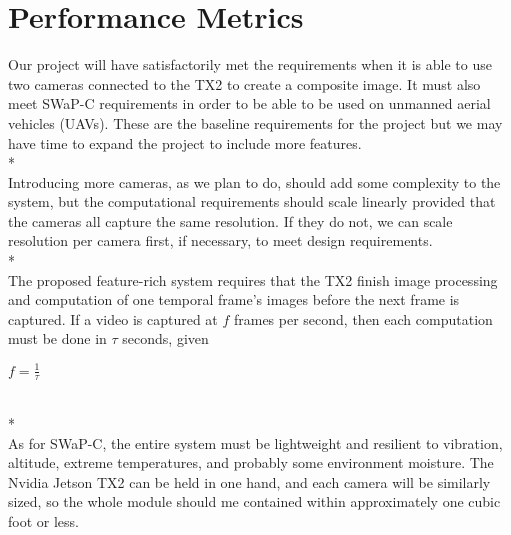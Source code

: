 \documentclass[10pt,letterpaper,draftclsnofoot,onecolumn]{report}
\begin{document}
\section*{Performance Metrics}
Our project will have satisfactorily met the requirements when it is able to use two cameras connected to the TX2 to create a composite image. It must also meet SWaP-C requirements in order to be able to be used on unmanned aerial vehicles (UAVs). These are the baseline requirements for the project but we may have time to expand the project to include more features.
\\*\\
Introducing more cameras, as we plan to do, should add some complexity to the system, but the computational requirements should scale linearly provided that the cameras all capture the same resolution. If they do not, we can scale resolution per camera first, if necessary, to meet design requirements.
\\*\\
The proposed feature-rich system requires that the TX2 finish image processing and computation of one temporal frame's images before the next frame is captured. 
If a video is captured at $f$ frames per second, then each computation must be done in $\tau$ seconds, given \begin{center}
$f = \frac{1}{\tau}$
\end{center}
\\*\\
As for SWaP-C, the entire system must be lightweight and resilient to vibration, altitude, extreme temperatures, and probably some environment moisture. The Nvidia Jetson TX2 can be held in one hand, and each camera will be similarly sized, so the whole module should me contained within  approximately one cubic foot or less.
\end{document}
